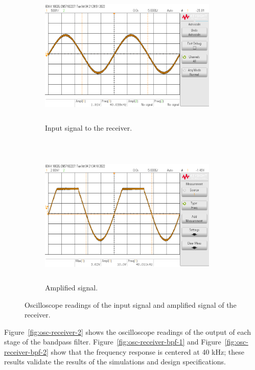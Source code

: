 \documentclass[class=report,11pt,crop=false]{standalone}
\begin{document}
\begin{figure}[htbp]
    \centering
    \captionsetup{type=figure}
    \begin{subfigure}[t]{0.5\textwidth}
        \centering
        \def\svgwidth{1\linewidth}
        {\scriptsize
            \includegraphics[width=8.5cm,height=6cm]{../Images/scope_7.png}}
        \caption{Input signal to the receiver.}
        \label{fig:osc-receiver-input}
    \end{subfigure}%
    ~ 
    \begin{subfigure}[t]{0.5\textwidth}
        \def\svgwidth{1\linewidth}
        {\scriptsize
            \includegraphics[width=8.5cm,height=6cm]{../Images/scope_8.png}}
        \caption{Amplified signal.}
        \label{fig:osc-receiver-amplifier}
    \end{subfigure}
    \caption{Oscilloscope readings of the input signal and amplified signal of the receiver.}
    \label{fig:osc-receiver-1}
\end{figure}

Figure~\ref{fig:osc-receiver-2} shows the oscilloscope readings of the output of each stage of the bandpass filter. Figure~\ref{fig:osc-receiver-bpf-1} and Figure~\ref{fig:osc-receiver-bpf-2} show that the frequency response is centered at 40 kHz; these results validate the results of the simulations and design specifications.
\end{document}
